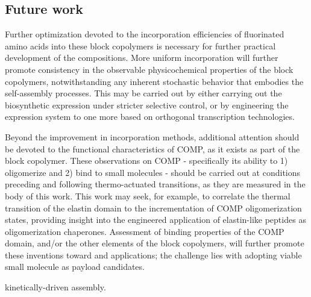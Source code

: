 \begin{refsection}
\subsection{Future work}

Further optimization devoted to the incorporation efficiencies of fluorinated
amino acids into these block copolymers is necessary for further practical
development of the compositions. More uniform incorporation will further promote
consistency in the observable physicochemical properties of the block
copolymers, notwithstanding any inherent stochastic behavior that embodies the
self-assembly processes. This may be carried out by either carrying out the
biosynthetic expression under stricter selective control, or by engineering the
expression system to one more based on orthogonal transcription technologies.

Beyond the improvement in incorporation methods, additional attention should be
devoted to the functional characteristics of COMP, as it exists as part of the
block copolymer. These observations on COMP - specifically its ability to 1)
oligomerize and 2) bind to small molecules - should be carried out at conditions
preceding and following thermo-actuated transitions, as they are measured in the
body of this work. This work may seek, for example, to correlate the thermal
transition of the elastin domain to the incrementation of COMP oligomerization
states, providing insight into the engineered application of elastin-like
peptides as oligomerization chaperones. Assessment of binding properties of the
COMP domain, and/or the other elements of the block copolymers, will further
promote these inventions toward  and 
applications; the challenge lies with adopting viable small molecule as payload
candidates.

kinetically-driven assembly.

\printbibliography[heading=subbibliography]

\end{refsection}
